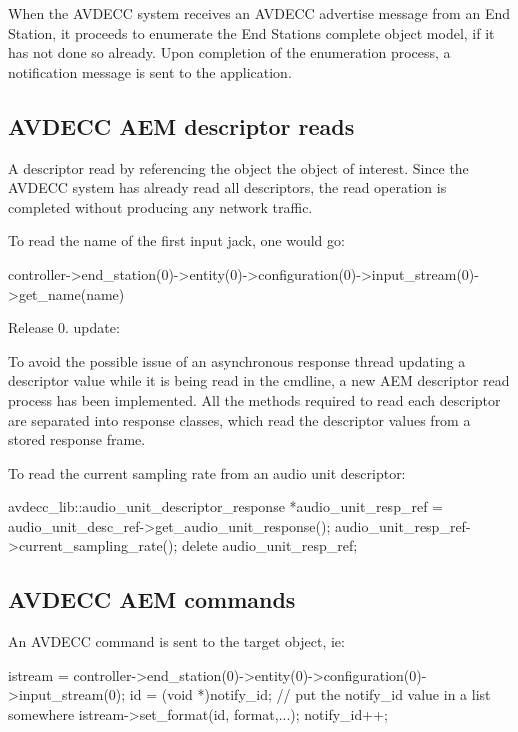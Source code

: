 When the A\+V\+D\+E\+CC system receives an A\+V\+D\+E\+CC advertise message from an End Station, it proceeds to enumerate the End Station\textquotesingle{}s complete object model, if it has not done so already. Upon completion of the enumeration process, a notification message is sent to the application.

\subsection*{A\+V\+D\+E\+CC A\+EM descriptor reads }

A descriptor read by referencing the object the object of interest. Since the A\+V\+D\+E\+CC system has already read all descriptors, the read operation is completed without producing any network traffic.

To read the name of the first input jack, one would go\+: \begin{DoxyVerb}controller->end_station(0)->entity(0)->configuration(0)->input_stream(0)->get_name(name)
\end{DoxyVerb}


Release 0. update\+:

To avoid the possible issue of an asynchronous response thread updating a descriptor value while it is being read in the cmdline, a new A\+EM descriptor read process has been implemented. All the methods required to read each descriptor are separated into response classes, which read the descriptor values from a stored response frame.

To read the current sampling rate from an audio unit descriptor\+: \begin{DoxyVerb}avdecc_lib::audio_unit_descriptor_response *audio_unit_resp_ref = audio_unit_desc_ref->get_audio_unit_response();
audio_unit_resp_ref->current_sampling_rate();
delete audio_unit_resp_ref;
\end{DoxyVerb}


\subsection*{A\+V\+D\+E\+CC A\+EM commands }

An A\+V\+D\+E\+CC command is sent to the target object, ie\+: \begin{DoxyVerb}istream = controller->end_station(0)->entity(0)->configuration(0)->input_stream(0);
id = (void *)notify_id;
// put the notify_id value in a list somewhere
istream->set_format(id, format,...);
notify_id++;
\end{DoxyVerb}


